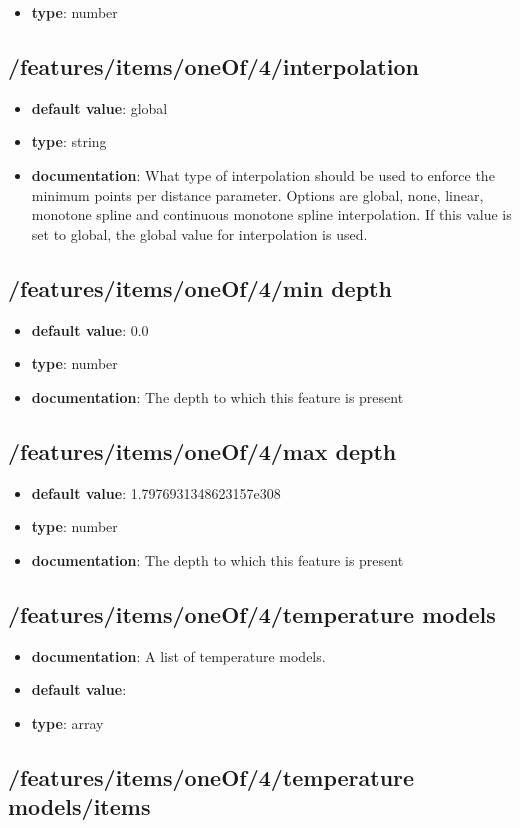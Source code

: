 \begin{itemize}\item {\bf type}: number
\end{itemize}\subsection{/features/items/oneOf/4/interpolation}
\begin{itemize}\item {\bf default value}: global
\item {\bf type}: string
\item {\bf documentation}: What type of interpolation should be used to enforce the minimum points per distance parameter. Options are global, none, linear, monotone spline and continuous monotone spline interpolation. If this value is set to global, the global value for interpolation is used.
\end{itemize}\subsection{/features/items/oneOf/4/min depth}
\begin{itemize}\item {\bf default value}: 0.0
\item {\bf type}: number
\item {\bf documentation}: The depth to which this feature is present
\end{itemize}\subsection{/features/items/oneOf/4/max depth}
\begin{itemize}\item {\bf default value}: 1.7976931348623157e308
\item {\bf type}: number
\item {\bf documentation}: The depth to which this feature is present
\end{itemize}\subsection{/features/items/oneOf/4/temperature models}
\begin{itemize}\item {\bf documentation}: A list of temperature models.
\item {\bf default value}: 
\item {\bf type}: array
\end{itemize}\subsection{/features/items/oneOf/4/temperature models/items}

